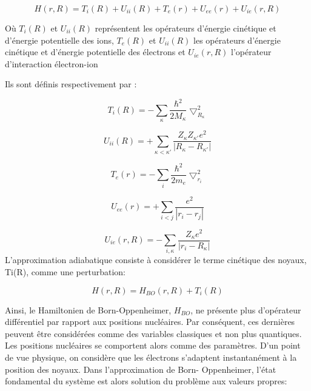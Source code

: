 \documentclass[12pt,a4paper]{book}
\begin{document}
\begin{equation}
H(r,R) = T_{i}(R) + U_{ii}(R) + T_{e}(r) + U_{ee}(r)+ U_{ie}(r,R)
\end{equation}

Où $T_{i}(R)$ et $U_{ii}(R)$ représentent les opérateurs d'énergie cinétique et d'énergie potentielle des ions, $T_{e}(R)$ et $U_{ii}(R)$ les opérateurs d'énergie cinétique et d'énergie potentielle des électrons et $U_{ie}(r,R)$ l'opérateur d'interaction électron-ion

Ils sont définis respectivement par :

\begin{equation}
T_{i}(R) = -\sum_{\kappa} \frac{\hbar^{2}}{2M_{\kappa}} \bigtriangledown^{2}_{R_{\kappa}}
\end{equation}

\begin{equation}
U_{ii}(R)= + \sum_{\kappa<\kappa'} \frac{Z_{\kappa}Z_{\kappa'}e^{2}}{|R_{\kappa}-R_{\kappa'}|}
\end{equation}

\begin{equation}
T_{e}(r) = -\sum_{i} \frac{\hbar^{2}}{2m_{e}} \bigtriangledown^{2}_{r_{i}}
\end{equation}

\begin{equation}
U_{ee}(r)= + \sum_{i<j} \frac{e^{2}}{|r_{i}-r_{j}|}
\end{equation}

\begin{equation}
U_{ie} (r,R) = -\sum_{i,\kappa} \frac{Z_{\kappa}e^{2}}{|r_{i}-R_{\kappa}|}
\end{equation}
L'approximation adiabatique consiste à considérer le terme cinétique des noyaux, Ti(R), comme une perturbation:

\begin{equation}
H(r,R) = H_{BO}(r,R) + T_{i}(R)
\end{equation}

Ainsi, le Hamiltonien de Born-Oppenheimer, $H_{BO}$, ne présente plus d'opérateur différentiel par rapport aux positions nucléaires. Par conséquent, ces dernières peuvent être considérées comme des variables classiques et non plus quantiques. Les positions nucléaires se comportent alors comme des paramètres. D'un point de vue physique, on considère que les électrons s'adaptent instantanément à la position des noyaux. Dans l'approximation de Born- Oppenheimer, l'état fondamental du système est alors solution du problème aux valeurs propres:
\end{document}
